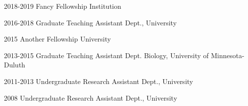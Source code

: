 

\begin{cvskills}

  \cvskill
    {2018-2019} %
    {Fancy Fellowship} %
    {Institution} %

  \cvskill
    {2016-2018} %
    {Graduate Teaching Assistant} %
    {Dept., University} %

  \cvskill
    {2015} %
    {Another Fellowship} %
    {University} %

  \cvskill
    {2013-2015} %
    {Graduate Teaching Assistant} %
    {Dept. Biology, University of Minnesota- Duluth} %

  \cvskill
    {2011-2013} %
    {Undergraduate Research Assistant} %
    {Dept., University} %

  \cvskill
    {2008} %
    {Undergraduate Research Assistant} %
    {Dept., University} %

\end{cvskills}
